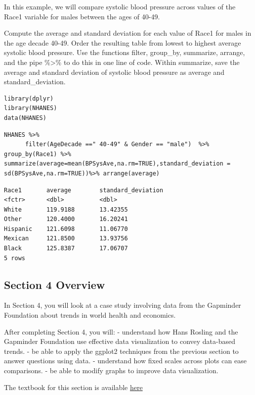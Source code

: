 \documentclass[
]{article}
\begin{document}
In this example, we will compare systolic blood pressure across values
of the Race1 variable for males between the ages of 40-49.

Compute the average and standard deviation for each value of Race1 for
males in the age decade 40-49. Order the resulting table from lowest to
highest average systolic blood pressure. Use the functions filter,
group\_by, summarize, arrange, and the pipe \%\textgreater\% to do this
in one line of code. Within summarize, save the average and standard
deviation of systolic blood pressure as average and standard\_deviation.

\begin{verbatim}
library(dplyr)
library(NHANES)
data(NHANES)
\end{verbatim}

\begin{verbatim}
NHANES %>%
      filter(AgeDecade ==" 40-49" & Gender == "male")  %>% group_by(Race1) %>% summarize(average=mean(BPSysAve,na.rm=TRUE),standard_deviation = sd(BPSysAve,na.rm=TRUE))%>% arrange(average)
\end{verbatim}

\begin{verbatim}
Race1       average        standard_deviation
<fctr>      <dbl>          <dbl>
White       119.9188       13.42355
Other       120.4000       16.20241
Hispanic    121.6098       11.06770
Mexican     121.8500       13.93756
Black       125.8387       17.06707
5 rows
\end{verbatim}

\hypertarget{section-4-overview}{%
\subsection{Section 4 Overview}\label{section-4-overview}}

In Section 4, you will look at a case study involving data from the
Gapminder Foundation about trends in world health and economics.

After completing Section 4, you will: - understand how Hans Rosling and
the Gapminder Foundation use effective data visualization to convey
data-based trends. - be able to apply the ggplot2 techniques from the
previous section to answer questions using data. - understand how fixed
scales across plots can ease comparisons. - be able to modify graphs to
improve data visualization.

The textbook for this section is available
\href{https://rafalab.github.io/dsbook/gapminder.html\#case-study-new-insights-on-poverty}{here}
\end{document}
